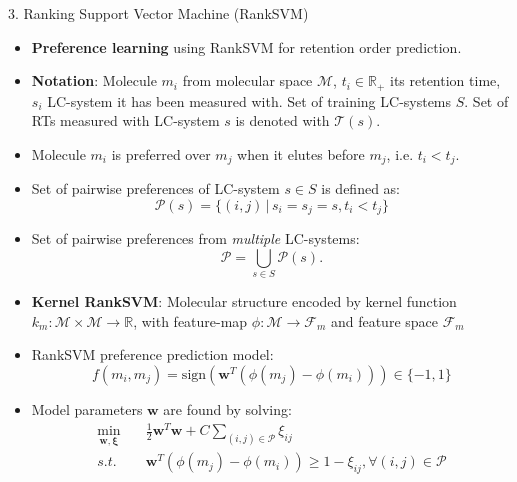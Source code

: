 \documentclass{beamer}
\newcommand{\VEC}[1]{\mathbf{#1}}
\newcommand{\mol}{m}
\newcommand{\sys}{s}
\newcommand{\molspace}{\mathcal{M}}
\newcommand{\rettimespace}{\mathbb{R}_{+}}
\newcommand{\kmol}{k_m} %
\newcommand{\Fmol}{\mathcal{F}_m} %
\newcommand{\Pref}{\mathcal{P}}
\newcommand{\RTimes}{\mathcal{T}}
\newcommand{\sgn}{\mathrm{sign}}
\begin{document}
\begin{frame}{}
\begin{columns}[T]
\begin{column}{.48\linewidth}
\begin{block}       {{\normalsize 3. Ranking Support Vector Machine (RankSVM)}}
\begin{itemize}
                    \setlength\itemsep{0.25em}
                    \item \textbf{Preference learning} using RankSVM \citep{Joachims2002} for retention order prediction.
                    \item \textbf{Notation}: Molecule $\mol_i$ from molecular space $\molspace$, $t_i\in\rettimespace$ its retention time, $\sys_i$ LC-system it has been measured with. Set of training LC-systems $S$. Set of RTs measured with LC-system $\sys$ is denoted with $\RTimes(s)$.
                    \item Molecule $\mol_i$ is preferred over $\mol_j$ when it elutes before $\mol_j$, i.e. $t_i<t_j$.
                    \item Set of pairwise preferences of LC-system $\sys\in S$ is defined as:                    
\begin{equation}
                    \Pref(s)=\{(i,j)\,|\,s_i = s_j = s,t_i<t_j\} \label{eq:pairwise_preferences_from_system_s}
\end{equation}                    
                    \item Set of pairwise preferences from \emph{multiple} LC-systems:
\begin{equation}
                    \Pref=\bigcup_{\sys \in S}  \Pref(s) \label{eq:pairwise_preferences_from_all_systems}.
\end{equation}                   
                    \item \textbf{Kernel RankSVM}: Molecular structure encoded by kernel function $\kmol:\molspace\times\molspace\rightarrow\mathbb{R}$, with feature-map $\phi:\molspace\rightarrow\Fmol$ and feature space $\Fmol$
                    \item RankSVM preference prediction model: 
\begin{equation}
                    f(\mol_i,\mol_j) = \sgn(\VEC{w}^T(\phi(\mol_j)-\phi(\mol_i)))\in\{-1,1\}
\end{equation}
                    \item Model parameters $\VEC{w}$ are found by solving:
\begin{align}
                    \underset{\VEC{w},\VEC{\xi}}{\min} &\quad \frac{1}{2}\VEC{w}^T\VEC{w} + C\sum_{(i,j)\in  \Pref}\xi_{ij} \\
                    s.t. &\quad\VEC{w}^T(\phi(\mol_j)-\phi(\mol_i))\geq 1-\xi_{ij}, \forall(i,j)\in  \Pref\label{prob:rankSVM-primal}\\

\end{align}
\end{itemize}
\end{block}
\end{column}
\end{columns}
\end{frame}
\end{document}
